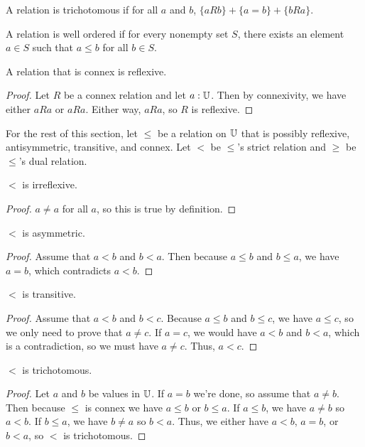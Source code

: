 \documentclass[../../math.tex]{subfiles}
\begin{document}
\begin{class}
    A relation is trichotomous if for all $a$ and $b$, $\{aRb\} + \{a = b\} +
    \{bRa\}$.
\end{class}

\begin{class}
    A relation is well ordered if for every nonempty set $S$, there exists an
    element $a \in S$ such that $a \leq b$ for all $b \in S$.
\end{class}

\begin{instance}
    A relation that is connex is reflexive.
\end{instance}
\begin{proof}
    Let $R$ be a connex relation and let $a : \mathbb{U}$.  Then by connexivity, we have
    either $aRa$ or $aRa$.  Either way, $aRa$, so $R$ is reflexive.
\end{proof}

For the rest of this section, let $\leq$ be a relation on $\mathbb{U}$ that is possibly
reflexive, antisymmetric, transitive, and connex.  Let $<$ be $\leq$'s strict
relation and $\geq$ be $\leq$'s dual relation.

\begin{instance}
    $<$ is irreflexive.
\end{instance}
\begin{proof}
    $a \neq a$ for all $a$, so this is true by definition.
\end{proof}

\begin{instance}
    $<$ is asymmetric.
\end{instance}
\begin{proof}
    Assume that $a < b$ and $b < a$.  Then because $a \leq b$ and $b \leq a$, we
    have $a = b$, which contradicts $a < b$.
\end{proof}

\begin{instance}
    $<$ is transitive.
\end{instance}
\begin{proof}
    Assume that $a < b$ and $b < c$.  Because $a \leq b$ and $b \leq c$, we have
    $a \leq c$, so we only need to prove that $a \neq c$.  If $a = c$, we would
    have $a < b$ and $b < a$, which is a contradiction, so we must have $a \neq
    c$.  Thus, $a < c$.
\end{proof}

\begin{instance}
    $<$ is trichotomous.
\end{instance}
\begin{proof}
    Let $a$ and $b$ be values in $\mathbb{U}$.  If $a = b$ we're done, so assume that $a
    \neq b$.  Then because $\leq$ is connex we have $a \leq b$ or $b \leq a$.
    If $a \leq b$, we have $a \neq b$ so $a < b$.  If $b \leq a$, we have $b
    \neq a$ so $b < a$.  Thus, we either have $a < b$, $a = b$, or $b < a$, so
    $<$ is trichotomous.
\end{proof}
\end{document}
